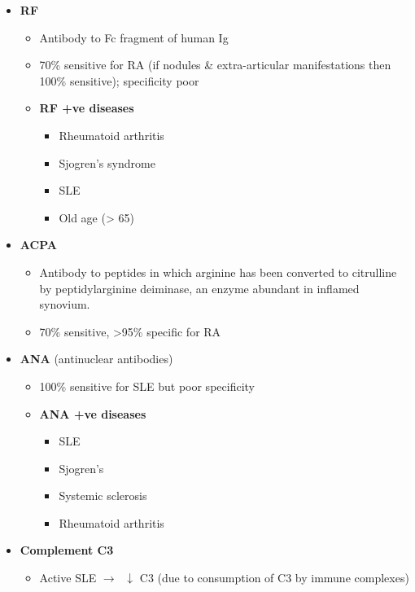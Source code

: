 \documentclass[
  12pt,
]{memoir}
\providecommand{\tightlist}{%
  \setlength{\itemsep}{0pt}\setlength{\parskip}{0pt}}
\begin{document}
\begin{itemize}
\tightlist
\item
  \textbf{RF}

  \begin{itemize}
  \tightlist
  \item
    Antibody to Fc fragment of human Ig
  \item
    70\% sensitive for RA (if nodules \& extra-articular manifestations
    then 100\% sensitive); specificity poor
  \item
    \textbf{RF +ve diseases}

    \begin{itemize}
    \tightlist
    \item
      Rheumatoid arthritis
    \item
      Sjogren's syndrome
    \item
      SLE
    \item
      Old age (\textgreater{} 65)
    \end{itemize}
  \end{itemize}
\item
  \textbf{ACPA}

  \begin{itemize}
  \tightlist
  \item
    Antibody to peptides in which arginine has been converted to
    citrulline by peptidylarginine deiminase, an enzyme abundant in
    inflamed synovium.
  \item
    70\% sensitive, \textgreater95\% specific for RA
  \end{itemize}
\item
  \textbf{ANA} (antinuclear antibodies)

  \begin{itemize}
  \tightlist
  \item
    100\% sensitive for SLE but poor specificity
  \item
    \textbf{ANA +ve diseases}

    \begin{itemize}
    \tightlist
    \item
      SLE
    \item
      Sjogren's
    \item
      Systemic sclerosis
    \item
      Rheumatoid arthritis
    \end{itemize}
  \end{itemize}
\item
  \textbf{Complement C3}

  \begin{itemize}
  \tightlist
  \item
    Active SLE \(\rightarrow\;\;\downarrow\) C3 (due to consumption of
    C3 by immune complexes)
  \end{itemize}
\end{itemize}
\end{document}
